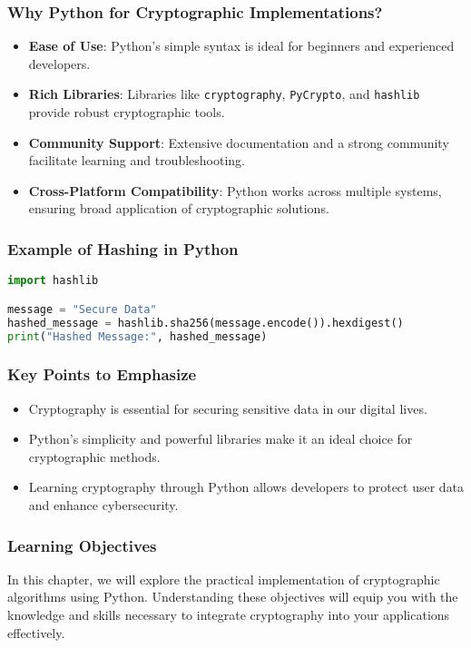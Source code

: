 \documentclass{beamer}
\begin{document}
\begin{frame}[fragile]
    \frametitle{Why Python for Cryptographic Implementations?}
    \begin{itemize}
        \item \textbf{Ease of Use}: Python’s simple syntax is ideal for beginners and experienced developers.
        \item \textbf{Rich Libraries}: Libraries like \texttt{cryptography}, \texttt{PyCrypto}, and \texttt{hashlib} provide robust cryptographic tools.
        \item \textbf{Community Support}: Extensive documentation and a strong community facilitate learning and troubleshooting.
        \item \textbf{Cross-Platform Compatibility}: Python works across multiple systems, ensuring broad application of cryptographic solutions.
    \end{itemize}
\end{frame}

\begin{frame}[fragile]
    \frametitle{Example of Hashing in Python}
    \begin{lstlisting}[language=Python]
import hashlib

message = "Secure Data"
hashed_message = hashlib.sha256(message.encode()).hexdigest()
print("Hashed Message:", hashed_message)
    \end{lstlisting}
\end{frame}

\begin{frame}[fragile]
    \frametitle{Key Points to Emphasize}
    \begin{itemize}
        \item Cryptography is essential for securing sensitive data in our digital lives.
        \item Python's simplicity and powerful libraries make it an ideal choice for cryptographic methods.
        \item Learning cryptography through Python allows developers to protect user data and enhance cybersecurity.
    \end{itemize}
\end{frame}

\begin{frame}
    \frametitle{Learning Objectives}
    In this chapter, we will explore the practical implementation of cryptographic algorithms using Python. 
    Understanding these objectives will equip you with the knowledge and skills necessary to integrate cryptography into your applications effectively.
\end{frame}
\end{document}
